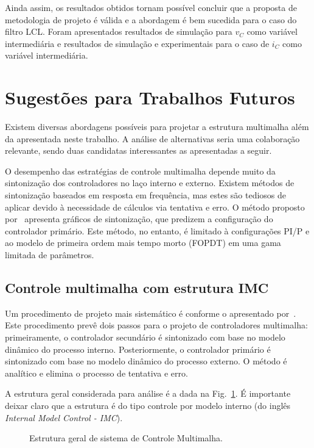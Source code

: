   Ainda assim, os resultados obtidos tornam possível concluir que a proposta de metodologia de projeto é válida e a abordagem é bem sucedida para o caso do filtro LCL. Foram apresentados resultados de simulação para $v_C$ como variável intermediária e resultados de simulação e experimentais para o caso de $i_C$ como variável intermediária.

\section{Sugestões para Trabalhos Futuros}

  Existem diversas abordagens possíveis para projetar a estrutura multimalha além da apresentada neste trabalho. A análise de alternativas seria uma colaboração relevante, sendo duas candidatas interessantes as apresentadas a seguir.

  O desempenho das estratégias de controle multimalha depende muito da sintonização dos controladores no laço interno e externo. Existem métodos de sintonização baseados em resposta em frequência, mas estes são tediosos de aplicar devido à necessidade de cálculos via tentativa e erro. O método proposto por~\cite{ref:KRISHNA} apresenta gráficos de sintonização, que predizem a configuração do controlador primário. Este método, no entanto, é limitado à configurações PI/P e ao modelo de primeira ordem mais tempo morto (FOPDT) em uma gama limitada de parâmetros.

  \subsection{Controle multimalha com estrutura IMC}

  Um procedimento de projeto mais sistemático é conforme o apresentado por~\cite{ref:LEE}. Este procedimento prevê dois passos para o projeto de controladores multimalha: primeiramente, o controlador secundário é sintonizado com base no modelo dinâmico do processo interno. Posteriormente, o controlador primário é sintonizado com base no modelo dinâmico do processo externo. O método é analítico e elimina o processo de tentativa e erro.

  A estrutura geral considerada para análise é a dada na
  Fig.~\ref{fig:multiloop_lee}. É importante deixar claro que a estrutura é do tipo controle por modelo interno (do inglês \emph{Internal Model Control - IMC}).
  \begin{figure}[htb]
    \centering
      \def\svgwidth{\textwidth}
      
    \renewcommand\figurename{Fig.}
    \caption{Estrutura geral de sistema de Controle Multimalha.}
    \label{fig:multiloop_lee}
  \end{figure}

